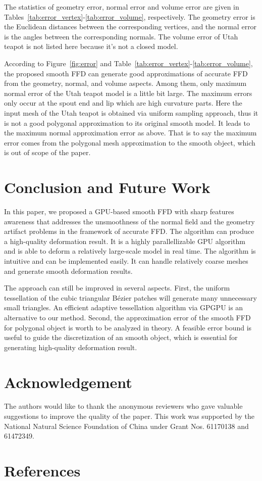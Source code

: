 \documentclass[3p]{elsarticle}
\begin{document}
The statistics of geometry error, normal error and volume error are given in
Tables~\ref{tab:error_vertex}-\ref{tab:error_volume}, respectively. The geometry error is the Euclidean distances
between the corresponding vertices, and the normal error is the angles between the corresponding normals. The volume
error of Utah teapot is not listed here because it's not a closed model.

According to Figure~\ref{fig:error} and Table~\ref{tab:error_vertex}-\ref{tab:error_volume}, the proposed smooth FFD can
generate good approximations of accurate FFD from the geometry, normal, and volume aspects. Among them, only maximum
normal error of the Utah teapot model is a little bit large. The maximum errors only occur at the spout end and lip
which are high curvature parts. Here the input mesh of the Utah teapot is obtained via uniform sampling approach, thus
it is not a good polygonal approximation to its original smooth model. It leads to the maximum normal approximation
error as above. That is to say the maximum error comes from the polygonal mesh approximation to the smooth object, which
is out of scope of the paper. 
\section{Conclusion and Future Work}

In this paper, we proposed a GPU-based smooth FFD with sharp features awareness that addresses the unsmoothness of the
normal field and the geometry artifact problems in the framework of accurate FFD. The algorithm can produce a
high-quality deformation result. It is a highly parallellizable GPU algorithm and is able to deform a relatively
large-scale model in real time. The algorithm is intuitive and can be implemented easily. It can handle relatively
coarse meshes and generate smooth deformation results.

The approach can still be improved in several aspects. First, the uniform tessellation of the cubic triangular B\'ezier
patches will generate many unnecessary small triangles. An efficient adaptive tessellation algorithm via GPGPU is an
alternative to our method. Second, the approximation error of the smooth FFD for polygonal object is worth to be
analyzed in theory. A feasible error bound is useful to guide the discretization of an smooth object, which is essential
for generating high-quality deformation result.

\section{Acknowledgement}

The authors would like to thank the anonymous reviewers who gave valuable suggestions to improve the quality of the
paper. This work was supported by the National Natural Science Foundation of China under Grant Nos. 61170138 and
61472349.

\section*{References}


\end{document}
